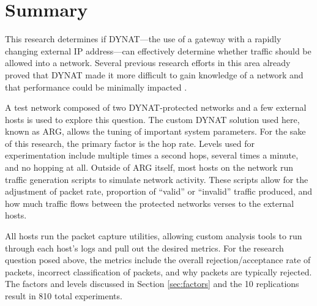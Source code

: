 \section{Summary}
\label{sec:method_summary}

\par This research determines if \ac{DYNAT}---the use of a gateway with a rapidly changing external \ac{IP} address---can effectively determine whether traffic should be allowed into a network. Several previous research efforts in this area already proved that \ac{DYNAT} made it more difficult to gain knowledge of a network \cite{BBNDYNAT} and that performance could be minimally impacted \cite{NAH}. 

\par A test network composed of two \ac{DYNAT}-protected networks and a few external hosts is used to explore this question. The custom \ac{DYNAT} solution used here, known as \ac{ARG}, allows the tuning of important system parameters. For the sake of this research, the primary factor is the hop rate. Levels used for experimentation include multiple times a second hops, several times a minute, and no hopping at all. Outside of \ac{ARG} itself, most hosts on the network run traffic generation scripts to simulate network activity. These scripts allow for the adjustment of packet rate, proportion of ``valid'' or ``invalid'' traffic produced, and how much traffic flows between the protected networks verses to the external hosts.

\par All hosts run the packet capture utilities, allowing custom analysis tools to run through each host's logs and pull out the desired metrics. For the research question posed above, the metrics include the overall rejection/acceptance rate of packets, incorrect classification of packets, and why packets are typically rejected. The factors and levels discussed in Section \ref{sec:factors} and the 10 replications result in 810 total experiments.

